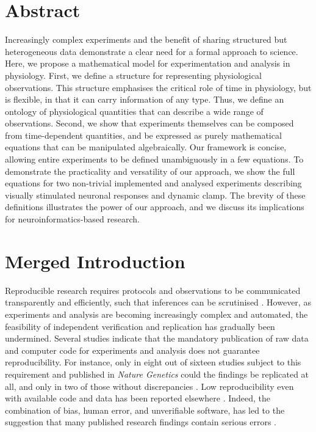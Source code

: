 
\section*{Abstract}

Increasingly complex experiments and the benefit of sharing structured
but heterogeneous data demonstrate a clear need for a formal approach
to science.  Here, we propose a mathematical model for
experimentation and analysis in physiology. First, we define a
structure for representing physiological observations. This structure
emphasises the critical role of time in physiology, but is flexible,
in that it can carry information of any type. Thus, we define an
ontology of physiological quantities that can describe a wide range of
observations. Second, we show that experiments themselves can be
composed from time-dependent quantities, and be expressed as purely
mathematical equations that can be manipulated algebraically. Our
framework is concise, allowing entire experiments to be defined
unambiguously in a few equations. To demonstrate the practicality and
versatility of our approach, we show the full equations for two
non-trivial implemented and analysed experiments describing visually
stimulated neuronal responses and dynamic clamp. The brevity of these
definitions illustrates the power of our approach, and we discuss its
implications for neuroinformatics-based research.

\pagebreak

\section*{Merged Introduction}

Reproducible research requires protocols and observations to be
communicated transparently and efficiently, such that inferences can
be scrutinised \citep{Fomel2009}. However, as experiments and analysis
are becoming increasingly complex and automated, the feasibility of
independent verification and replication has gradually been
undermined. Several studies indicate that the mandatory publication
\citep{Baggerly2010, Barnes2010} of raw data and computer code for
experiments and analysis does not guarantee reproducibility.  For
instance, only in eight out of sixteen studies subject to this
requirement and published in \emph{Nature Genetics} could the findings
be replicated at all, and only in two of those without discrepancies
\citep{Ioannidis2008}. Low reproducibility even with available 
code and data has been reported elsewhere \citep{Baggerly2009,
  McCullough2007}. Indeed, the combination of bias, human error, and
unverifiable software, has led to the suggestion that many published
research findings contain serious errors \cite{Ioannidis2005,
  Merali2010}.

